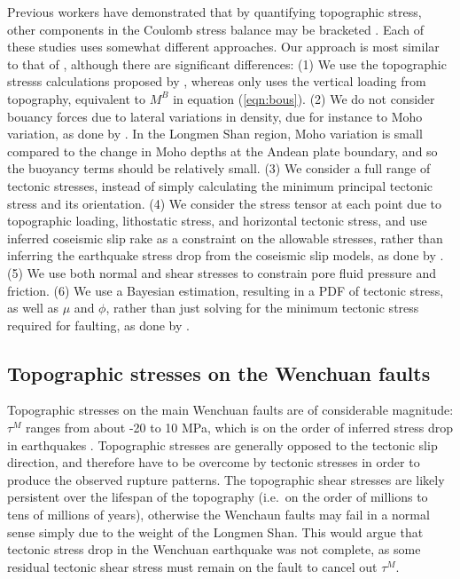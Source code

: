\documentclass[twocolumn,jgrga]{AGUTeX}
\begin{document}
\begin{article}
{Previous workers have demonstrated that by quantifying topographic
stress, other components in the Coulomb stress balance may be bracketed
\citep[e.g.,][]{cattin1997, lamb2006, luttrell2011}. Each of these studies
uses somewhat different approaches. Our approach is most similar to that
of \citet{luttrell2011}, although there are significant
differences: (1) We use the topographic stresss calculations proposed by
\citet{liuzoback1992}, whereas 
\citet{luttrell2011} only uses the vertical loading from topography,
equivalent to $M^B$ in equation (\ref{eqn:bous}). (2) We do not consider
bouancy forces due to lateral variations in density, due for instance to
Moho variation, as done by \citet{luttrell2011}. In the
Longmen Shan region, Moho variation is small compared to the change in
Moho depths at the Andean plate boundary, and so the buoyancy terms
should be relatively small. (3) We consider a full range of tectonic
stresses, instead of simply calculating the minimum principal tectonic
stress and its orientation. (4) We consider the stress tensor at each
point due to topographic loading, lithostatic stress, and horizontal
tectonic stress, and use inferred coseismic slip rake as a constraint on
the allowable stresses, rather than inferring the earthquake stress drop
from the coseismic slip models, as done by 
\citet{luttrell2011}. (5) We use both normal and shear stresses to
constrain pore fluid pressure and friction. (6) We use a Bayesian
estimation, resulting in a PDF of tectonic stress, as well as $\mu$ and
$\phi$, rather than just solving for the minimum tectonic stress
required for faulting, as done by \citet{luttrell2011}.

\subsection{Topographic stresses on the Wenchuan
faults}\label{topographic-stresses-on-the-wenchuan-faults}

Topographic stresses on the main Wenchuan faults are of considerable
magnitude: $\tau^M$ ranges from about -20 to 10 MPa, which is on the
order of inferred stress drop in earthquakes \citep[e.g.,][]{kanamori1975,
allmann2009}. Topographic stresses are
generally opposed to the tectonic slip direction, and therefore have to
be overcome by tectonic stresses in order to produce the observed
rupture patterns. The topographic shear stresses are likely persistent
over the lifespan of the topography (i.e.~on the order of millions to
tens of millions of years), otherwise the Wenchaun faults may fail in a
normal sense simply due to the weight of the Longmen Shan. This would
argue that tectonic stress drop in the Wenchuan earthquake was not
complete, as some residual tectonic shear stress must remain on the
fault to cancel out $\tau^M$.

}
\end{article}
\end{document}
